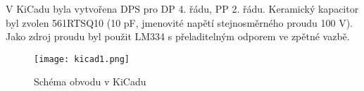\noindent V KiCadu byla vytvořena DPS pro DP 4. řádu, PP 2. řádu. Keramický kapacitor byl zvolen 561RTSQ10 (10 pF, jmenovité napětí stejnosměrného proudu 100 V). Jako zdroj proudu byl použit LM334 s přeladitelným odporem ve zpětné vazbě.
\begin{figure}[h]
\centering
\texttt{[image: kicad1.png]}
\caption{Schéma obvodu v KiCadu}
\end{figure}